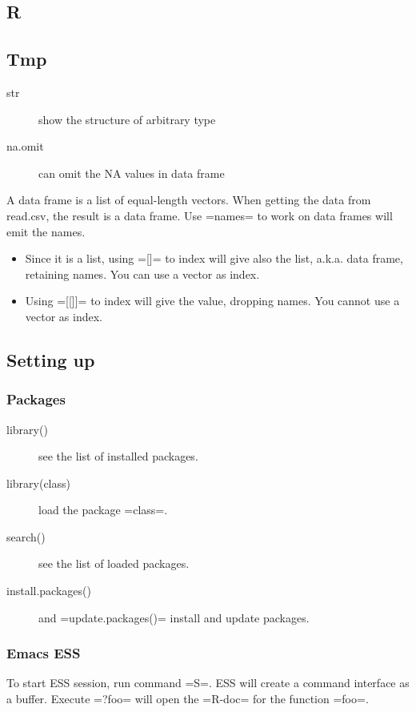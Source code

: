 \subsection{R}



\subsection{Tmp}
\begin{description}
\item [str] show the structure of arbitrary type
\item [na.omit] can omit the NA values in data frame
\end{description}

A data frame is a list of equal-length vectors.  When getting the data
from read.csv, the result is a data frame.  Use =names= to work on
data frames will emit the names.
\begin{itemize}
\item Since it is a list, using =[]= to index will give also the list,
  a.k.a. data frame, retaining names.  You can use a vector as index.
\item Using =[[]]= to index will give the value, dropping names.  You
  cannot use a vector as index.
\end{itemize}

\subsection{Setting up}

\subsubsection{Packages}
\begin{description}
\item [library()] see the list of installed packages.
\item [library(class)] load the package =class=.
\item [search()] see the list of loaded packages.
\item [install.packages()] and =update.packages()= install and update packages.
\end{description}

\subsubsection{Emacs ESS}
To start ESS session, run command =S=.  ESS will create a command
interface as a buffer.  Execute =?foo= will open the =R-doc= for the
function =foo=.

